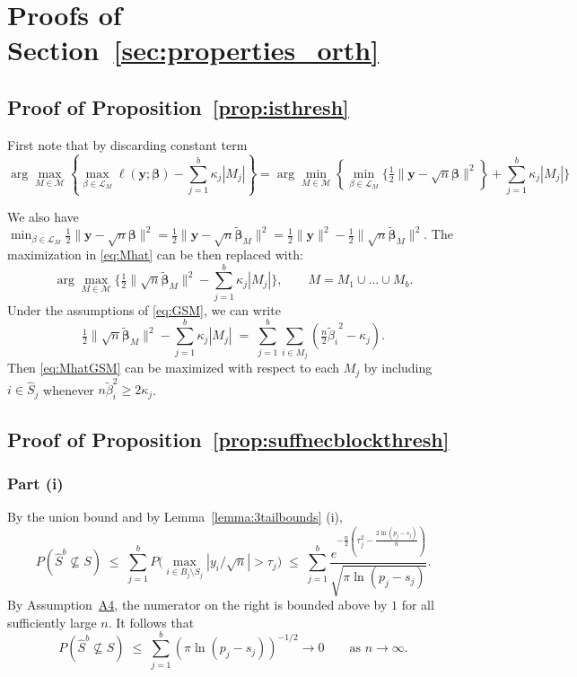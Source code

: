 \documentclass[bj,authoryear]{imsart}
\theoremstyle{plain}
\newcommand{\M}{\mathcal{M}}
\newcommand{\bs}{\boldsymbol}
\begin{document}
\section{Proofs of Section~\ref{sec:properties_orth}}\label{suppsec:proofsecgsm}
 
 

\subsection{Proof of Proposition~\ref{prop:isthresh}}
First note that by discarding constant term 
 $$\arg\max_{M\in \M} \left\{\max_{\beta\in \mathcal{L}_M}\ell(\bs y; \bs \beta)-\sum_{j=1}^b\kappa_j |M_j| \right\}=\arg\min_{M\in \M} \left\{\min_{\beta\in \mathcal{L}_M}\bigg\{ \tfrac{1}{2}\|\bs y-\sqrt{n}\bs\beta\|^2\right\}+\sum_{j=1}^b\kappa_j |M_j| \bigg\}$$

 We also have $\min_{\beta\in \mathcal{L}_M} \tfrac{1}{2}\|\bs y-\sqrt{n}\bs\beta\|^2=\tfrac{1}{2}\|\bs y-\sqrt{n}\tilde{\bs \beta}_M\|^2=\tfrac{1}{2}\|\bs y\|^2-\tfrac{1}{2}\|\sqrt{n}\tilde{\bs \beta}_M\|^2$. The maximization in \eqref{eq:Mhat} can be then replaced with:
     \begin{equation}\label{eq:MhatGSM}
  \arg\max_{M\in \M} \bigg\{\tfrac{1}{2}\| \sqrt{n}\tilde{\bs \beta}_M\|^2-\sum_{j=1}^b\kappa_j |M_j|\bigg\}, \qquad M=M_1\cup \ldots\cup M_b.	
\end{equation}
Under the assumptions of \eqref{eq:GSM}, we can write 
	$$
	\tfrac{1}{2}\|\sqrt{n}\tilde{\bs \beta}_M\|^2-\sum_{j=1}^b\kappa_j |M_j|\;=\;\sum_{j=1}^b\sum_{i\in M_j}(\tfrac{n}{2}{\tilde{ \beta}_i}^2-\kappa_j).
	$$
	Then \eqref{eq:MhatGSM} can be maximized with respect to each $M_j$ by including $i\in \hat S_j$ whenever $n\tilde\beta_i^2\geq 2\kappa_j$.

\subsection{Proof of Proposition~\ref{prop:suffnecblockthresh}} 

\subsubsection{Part (i)} 
By the union bound and by Lemma~\ref{lemma:3tailbounds} (i),
\begin{equation}\label{eq:type1convrate}
P\left(\hat{S}^{b} \not\subseteq S\right)\;\leq\; \sum_{j=1}^b P\Big(\max_{i\in B_j\setminus S_j}|y_i/\sqrt{n}|>\tau_{j}\Big)\;\leq\;\sum_{j=1}^b\frac{e^{-\tfrac{n}{2}\left(\tau_j^2-\tfrac{2\ln(p_j-s_j)}{n}\right)}}{\sqrt{\pi\ln(p_j-s_j)}} 	.
 \end{equation}
 By Assumption~\hyperlink{lab:A4}{A4}, the numerator on the right is bounded above by $1$ for all sufficiently large $n$. It follows that 
	$$P\left(\hat{S}^{b} \not\subseteq S\right) \;\leq\; \sum_{j=1}^b (\pi\ln (p_j-s_j))^{-1/2} \to 0\qquad \mbox{as } n\to \infty.$$
\end{document}

